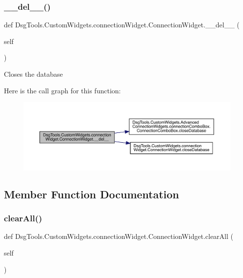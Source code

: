 \subsubsection{\texorpdfstring{\+\_\+\+\_\+del\+\_\+\+\_\+()}{\_\_del\_\_()}}
{\footnotesize\ttfamily def Dsg\+Tools.\+Custom\+Widgets.\+connection\+Widget.\+Connection\+Widget.\+\_\+\+\_\+del\+\_\+\+\_\+ (\begin{DoxyParamCaption}\item[{}]{self }\end{DoxyParamCaption})}

\begin{DoxyVerb}Closes the database
\end{DoxyVerb}
 Here is the call graph for this function\+:
\nopagebreak
\begin{figure}[H]
\begin{center}
\leavevmode
\includegraphics[width=350pt]{class_dsg_tools_1_1_custom_widgets_1_1connection_widget_1_1_connection_widget_a14c45f19e2a6d05229efad3806ae7a05_cgraph}
\end{center}
\end{figure}


\subsection{Member Function Documentation}
\mbox{\label{class_dsg_tools_1_1_custom_widgets_1_1connection_widget_1_1_connection_widget_a08811cc473d6f2a2c4775a6f93e825e4}} 
\subsubsection{\texorpdfstring{clear\+All()}{clearAll()}}
{\footnotesize\ttfamily def Dsg\+Tools.\+Custom\+Widgets.\+connection\+Widget.\+Connection\+Widget.\+clear\+All (\begin{DoxyParamCaption}\item[{}]{self }\end{DoxyParamCaption})}

